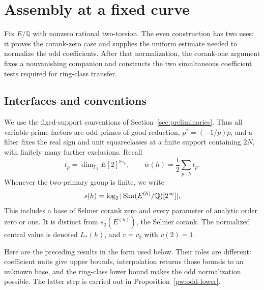 \section{Assembly at a fixed curve}\label{pw:section}

Fix $E/\mathbb Q$ with nonzero rational two-torsion.  The even construction
has two uses: it proves the corank-zero case and supplies the uniform
estimate needed to normalize the odd coefficients.  After that normalization,
the corank-one argument fixes a nonvanishing companion and constructs the
two simultaneous coefficient tests required for ring-class transfer.

\subsection{Interfaces and conventions}\label{pw:interfaces-section}

We use the fixed-support conventions of Section~\ref{sec:preliminaries}.
Thus all variable prime factors are odd primes of good reduction,
$p^*=(-1/p)p$, and a filter fixes the real sign and unit squareclasses
at a finite support containing $2N$, with finitely many further exclusions.
Recall
\[
 t_p=\dim_{\mathbb F_2}E[2]^{\operatorname{Fr}_p},\qquad
 w(h)=\frac12\sum_{p\mid h}t_p.
\]
Whenever the two-primary group is finite, we write
\[
s(h)=\log_2|\operatorname{Sha}(E^{(h)}/\mathbb Q)[2^\infty]|.
\]
This includes a base of Selmer corank zero and every parameter of analytic
order zero or one.  It is distinct from $s_2(E^{(h)})$, the Selmer corank.
The normalized central value is denoted $L_*(h)$, and $v=v_2$ with
$v(2)=1$.

Here are the preceding results in the form used below.  Their roles are
different: coefficient units give upper bounds, interpolation returns those
bounds to an unknown base, and the ring-class lower bound makes the odd
normalization possible.  The latter step is carried out in
Proposition~\ref{pw:odd-lower}.

